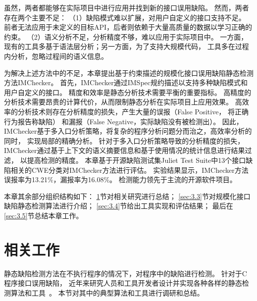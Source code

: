 虽然，两者都能够在实际项目中进行应用并找到新的接口误用缺陷。
然而，两者存在两个主要不足：
（1）缺陷模式难以扩展，对用户自定义的接口支持不足。
前者无法应用于未定义的目标API，后者则依赖于大量高质量的数据以学习正确的约束。
（2）语义分析不足，分析精度不够，难以应用于实际项目中。
一方面，现有的工具多基于语法层分析；另一方面，为了支持大规模代码，
工具多在过程内分析，忽略过程间的语义信息。


为解决上述方法中的不足，本章提出基于约束描述的规模化接口误用缺陷静态检测方法IMChecker。
首先，IMChecker通过IMSpec规约描述以支持多种缺陷模式和用户自定义的接口。
精度和效率是静态分析技术需要平衡的重要指标。
高精度的分析技术需要昂贵的计算代价，从而限制静态分析在实际项目上应用效果。
高效率的分析技术则存在分析精度的损失，产生大量的误报（False Positive， 将正确行为报告称缺陷）
和漏报（False Negative，实际缺陷没有被检测出）。
因此，IMChecker基于多入口分析策略，将复杂的程序分析问题分而治之，高效率分析的同时，
实现局部的精确分析。
针对于多入口分析策略导致的分析精度的损失，
IMChecker通过基于上下文的语义摘要信息和基于使用情况的统计信息进行结果过滤，
以提高检测的精度。
本章基于开源缺陷测试集Juliet Test Suite中13个接口缺陷相关的CWE分类对IMChecker方法进行评估。
实验结果显示，IMChecker方法误报率为13.21\%，漏报率为16.08\%。
检测能力领先于主流的开源软件项目。

本章其余部分组织结构如下：
\ref{sec:3.2}节对相关研究进行总结；
\ref{sec:3.3}节对规模化接口缺陷静态检测算法进行介绍；
\ref{sec:3.4}节给出工具实现和评估结果；
最后在\ref{sec:3.5}节总结本章工作。
\section{相关工作}
\label{sec:3.2}

静态缺陷检测方法在不执行程序的情况下，对程序中的缺陷进行检测。
针对于C程序接口误用缺陷，
近年来研究人员和工具开发者设计并实现各种各样的静态检测算法和工具~\cite{16-saner-evaluation, survey18}。
本节对其中的典型算法和工具进行调研和总结。

